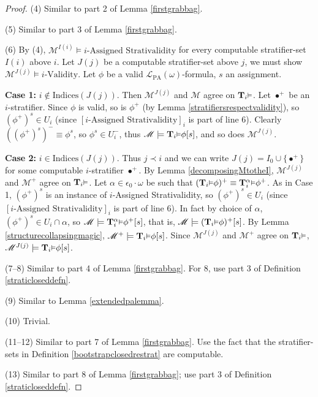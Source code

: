 \documentclass[reqno]{article}
\theoremstyle{definition}
\def\L{\mathscr{L}}
\def\M{\mathscr{M}}
\def\T{\mathbf{T}}
\def\indices{\mathrm{Indices}}
\def\LPA{\L_{\mathrm{PA}}}
\def\epom{\epsilon_0\cdot\omega}
\renewcommand{\Pr}[1]{\T_{#1}\mbox{\small${\vDash}$}}
\newcommand{\Prr}[2]{\T^{#1}_{#2}\mbox{\small${\vDash}$}}
\newcommand{\case}[1]{\textbf{Case #1:}}
\begin{document}
\begin{proof}
\item
(4)
Similar to part 2 of Lemma \ref{firstgrabbag}.

\item
(5)
Similar to part 3 of Lemma \ref{firstgrabbag}.

\item
(6)
By (4), $\M^{I(i)}\models\mbox{$i$-Assigned Strativalidity}$
for every computable stratifier-set $I(i)$ above $i$.
Let $J(j)$ be a computable stratifier-set above $j$, we must
show $\M^{J(j)}\models \mbox{$i$-Validity}$.
Let $\phi$ be a valid $\LPA(\omega)$-formula, $s$
an assignment.

\item
\case1
$i\not\in\indices(J(j))$.
Then $\M^{J(j)}$ and $\M$ agree on $\Pr i$.
Let $\bullet^+$ be an $i$-stratifier.
Since $\phi$ is valid, so is $\phi^+$
(by Lemma \ref{stratifiersrespectvalidity}),
so $(\phi^+)^s\in U_i$ (since $[\mbox{$i$-Assigned Strativalidity}]_i$ is
part of line 6).
Clearly $((\phi^+)^s)^-\equiv\phi^s$, so $\phi^s\in U^-_i$,
thus $\M\models \Pr i\phi[s]$, and so does $\M^{J(j)}$.

\item
\case2
$i\in\indices(J(j))$.
Thus $j\prec i$ and we can write $J(j)=I_0\cup\{\bullet^+\}$
for some computable $i$-stratifier $\bullet^+$.
By Lemma \ref{decomposingMtotheI}, $\M^{J(j)}$ and
$\M^+$ agree on $\Pr i$.
Let $\alpha\in\epom$ be such that
$(\Pr i\phi)^+\equiv \Prr\alpha i\phi^+$.
As in Case 1, $(\phi^+)^s$ is an instance of
$i$-Assigned Strativalidity,
so $(\phi^+)^s\in U_i$
(since $[\mbox{$i$-Assigned Strativalidity}]_i$ is
part of line 6).
In fact by choice of $\alpha$, $(\phi^+)^s\in U_i\cap \alpha$,
so $\M\models \Prr\alpha i\phi^+[s]$,
that is, $\M\models (\Pr i\phi)^+[s]$.
By Lemma \ref{structurecollapsingmagic},
$\M^+\models\Pr i\phi[s]$.
Since $\M^{J(j)}$ and $\M^+$ agree on $\Pr i$,
$\M^{J(j)}\models\Pr i\phi[s]$.

\item
(7--8)
Similar to part 4 of Lemma \ref{firstgrabbag}.  For 8, use
part 3 of Definition \ref{straticloseddefn}.

\item
(9)
Similar to Lemma \ref{extendedpalemma}.

\item
(10)
Trivial.

\item
(11--12)
Similar to part 7 of Lemma \ref{firstgrabbag}.
Use the fact that the stratifier-sets in Definition \ref{bootstrapclosedrestrat}
are computable.

\item
(13)
Similar to part 8 of Lemma \ref{firstgrabbag}; use
part 3 of Definition \ref{straticloseddefn}.
\end{proof}
\end{document}
